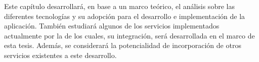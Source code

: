 Este capítulo desarrollará, en base a un marco teórico, el análisis sobre las diferentes tecnologías y su adopción para el desarrollo e implementación de la aplicación. 
También estudiará algunos de los servicios implementados actualmente por la \unlp  de los cuales, su integración, será desarrollada en el marco de esta tesis. Además, se considerará la potencialidad de incorporación de otros servicios existentes a este desarrollo.